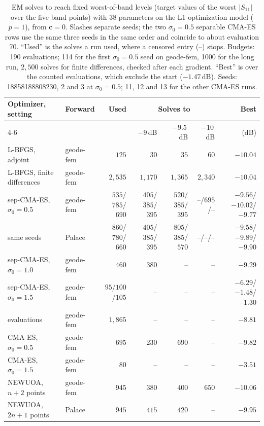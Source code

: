 \documentclass{anvil-paper}
\begin{document}
\begin{table}[t]
  \centering
  \caption{EM solves to reach fixed worst-of-band levels (target values of the
  worst $|S_{11}|$ over the five band points) with 38 parameters on the L1
  optimization model ($p = 1$), from $\mathbf{c} = 0$. Slashes separate
  seeds; the two $\sigma_0 = 0.5$ separable CMA-ES rows use the same three
  seeds in the same order and coincide to about evaluation 70. ``Used'' is
  the solves a run used, where a censored entry (--) stops. Budgets: 190
  evaluations; 114 for the first $\sigma_0 = 0.5$ seed on geode-fem, 1000
  for the long run, $2{,}500$ solves for finite differences, checked after
  each gradient. ``Best'' is over the counted evaluations, which exclude the
  start ($-1.47$\,dB). Seeds: 18858188808230, 2 and 3 at $\sigma_0 = 0.5$;
  11, 12 and 13 for the other CMA-ES runs.}
  \label{tab:baselines}
  \footnotesize
  \setlength{\tabcolsep}{3pt}
  \begin{tabular}{@{}l l r r r r r@{}}
    \toprule
    Optimizer, setting & Forward & Used & \multicolumn{3}{c}{Solves to} & Best \\
    \cmidrule(lr){4-6}
    & & & $-9$\,dB & $-9.5$\,dB & $-10$\,dB & (dB) \\
    \midrule
    L-BFGS, adjoint & geode-fem & $125$ & $30$ & $35$ & $60$ & $-10.04$ \\
    L-BFGS, finite differences & geode-fem & $2{,}535$ & $1{,}170$ & $1{,}365$ & $2{,}340$ & $-10.04$ \\
    \midrule
    sep-CMA-ES, $\sigma_0 = 0.5$ & geode-fem & $535$/$785$/$690$ & $405$/$385$/$395$ & $520$/$385$/$395$ & --/$695$/-- & $-9.56$/$-10.02$/$-9.77$ \\
    \quad same seeds & Palace & $860$/$780$/$660$ & $405$/$385$/$395$ & $805$/$385$/$570$ & --/--/-- & $-9.58$/$-9.89$/$-9.90$ \\
    sep-CMA-ES, $\sigma_0 = 1.0$ & geode-fem & $460$ & $380$ & -- & -- & $-9.29$ \\
    sep-CMA-ES, $\sigma_0 = 1.5$ & geode-fem & $95$/$100$/$105$ & -- & -- & -- & $-6.29$/$-1.48$/$-1.30$ \\
    \quad 1000 evaluations & geode-fem & $1{,}865$ & -- & -- & -- & $-8.81$ \\
    CMA-ES, $\sigma_0 = 0.5$ & geode-fem & $695$ & $230$ & $690$ & -- & $-9.82$ \\
    CMA-ES, $\sigma_0 = 1.5$ & geode-fem & $80$ & -- & -- & -- & $-3.51$ \\
    NEWUOA, $n + 2$ points & geode-fem & $945$ & $380$ & $400$ & $650$ & $-10.06$ \\
    NEWUOA, $2n + 1$ points & Palace & $945$ & $415$ & $420$ & -- & $-9.95$ \\
    \bottomrule
  \end{tabular}
\end{table}
\end{document}
